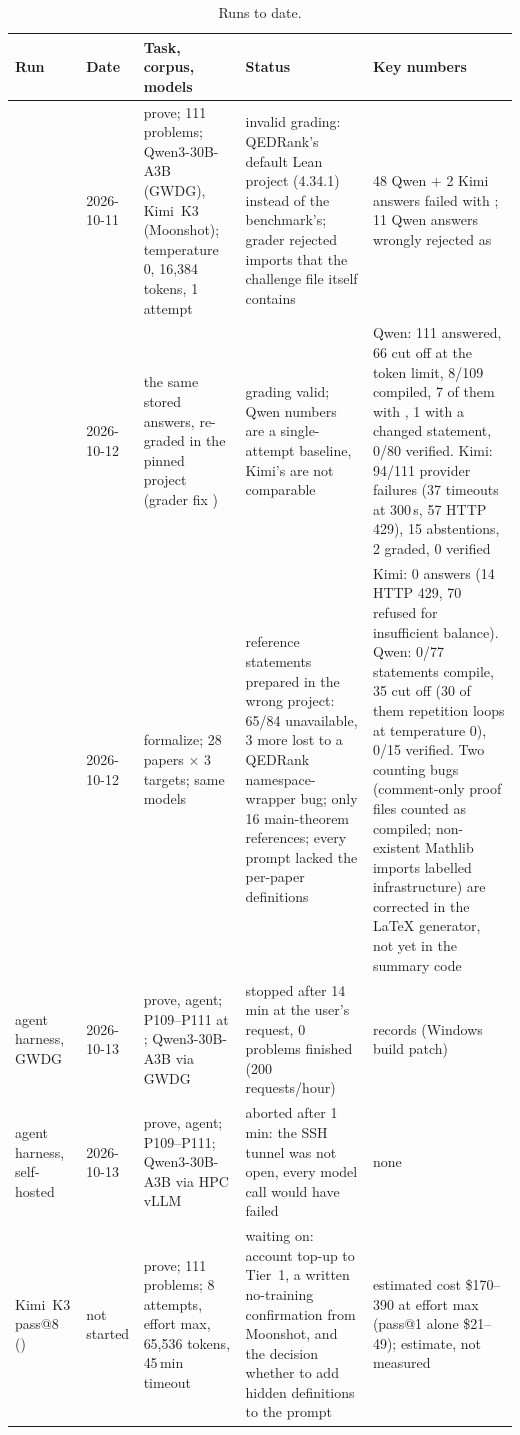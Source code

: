 \documentclass[11pt,a4paper]{article}
\begin{document}
\begin{table}[htbp]
\centering\small
\caption{Runs to date.}
\label{tab:runs}
\begin{tabular}{L{26mm}L{14mm}L{32mm}L{38mm}L{36mm}}
\toprule
Run & Date & Task, corpus, models & Status & Key numbers \\
\midrule
{} & 2026-10-11 & prove; 111 problems; Qwen3-30B-A3B (GWDG), Kimi~K3 (Moonshot); temperature 0, 16,384 tokens, 1 attempt & invalid grading: QEDRank's default Lean project (4.34.1) instead of the benchmark's; grader rejected imports that the challenge file itself contains & 48 Qwen + 2 Kimi answers failed with ; 11 Qwen answers wrongly rejected as  \\
 & 2026-10-12 & the same stored answers, re-graded in the pinned project (grader fix ) & grading valid; Qwen numbers are a single-attempt baseline, Kimi's are not comparable & Qwen: 111 answered, 66 cut off at the token limit, 8/109 compiled, 7 of them with , 1 with a changed statement, 0/80 verified. Kimi: 94/111 provider failures (37 timeouts at 300\,s, 57 HTTP 429), 15 abstentions, 2 graded, 0 verified \\
 & 2026-10-12 & formalize; 28 papers $\times$ 3 targets; same models & reference statements prepared in the wrong project: 65/84 unavailable, 3 more lost to a QEDRank namespace-wrapper bug; only 16 main-theorem references; every prompt lacked the per-paper definitions & Kimi: 0 answers (14 HTTP 429, 70 refused for insufficient balance). Qwen: 0/77 statements compile, 35 cut off (30 of them repetition loops at temperature 0), 0/15 verified. Two counting bugs (comment-only proof files counted as compiled; non-existent Mathlib imports labelled infrastructure) are corrected in the LaTeX generator, not yet in the summary code \\
agent harness, GWDG & 2026-10-13 & prove, agent; P109--P111 at ; Qwen3-30B-A3B via GWDG & stopped after 14\,min at the user's request, 0 problems finished (200 requests/hour) &  records  (Windows build patch) \\
agent harness, self-hosted & 2026-10-13 & prove, agent; P109--P111; Qwen3-30B-A3B via HPC vLLM & aborted after 1\,min: the SSH tunnel was not open, every model call would have failed & none \\
Kimi~K3 pass@8 () & not started & prove; 111 problems; 8 attempts, effort max, 65,536 tokens, 45\,min timeout & waiting on: account top-up to Tier~1, a written no-training confirmation from Moonshot, and the decision whether to add hidden definitions to the prompt & estimated cost \$170--390 at effort max (pass@1 alone \$21--49); estimate, not measured \\

\end{tabular}
\end{table}
\end{document}
